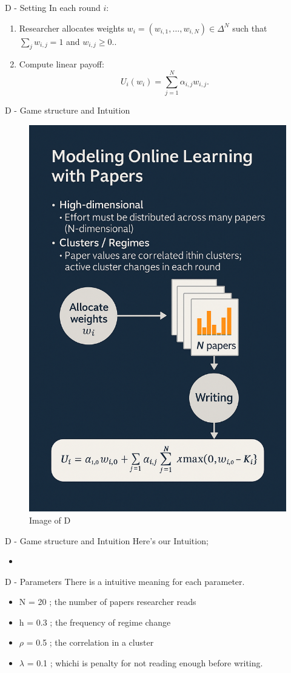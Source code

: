 \documentclass{beamer}
\begin{document}
\begin{frame}{D - Setting}
In each round $i$:
\begin{enumerate}
    \item Researcher allocates weights 
          $w_i = (w_{i,1}, \dots, w_{i,N}) \in \Delta^N$
          such that $\sum_j w_{i,j} = 1$ and $w_{i,j} \ge 0$..
    \item Compute linear payoff:
          \[
              U_i(w_i)
              = \sum_{j=1}^{N} \alpha_{i,j} w_{i,j}.
          \]
\end{enumerate}
\end{frame}

\begin{frame}{D - Game structure and Intuition}

\begin{figure}
    \centering
    \includegraphics[width=0.35\linewidth]{332Project2/figures/Image_D.png}
    \caption{Image of D}
    \label{fig:placeholder}
\end{figure} 
\end{frame}

\begin{frame}{D - Game structure and Intuition}
Here's our Intuition;
\begin{itemize}
    \item 
\end{itemize}
\end{frame}

\begin{frame}{D - Parameters}
There is a intuitive meaning for each parameter.
\begin{itemize}
    \item N = 20 ; the number of papers researcher reads
    \item h = 0.3 ; the frequency of regime change
    \item $\rho$ = 0.5 ; the correlation in a cluster
    \item $\lambda$ = 0.1 ; whichi is penalty for not reading enough before writing. 
\end{itemize}
\end{frame}
\end{document}

